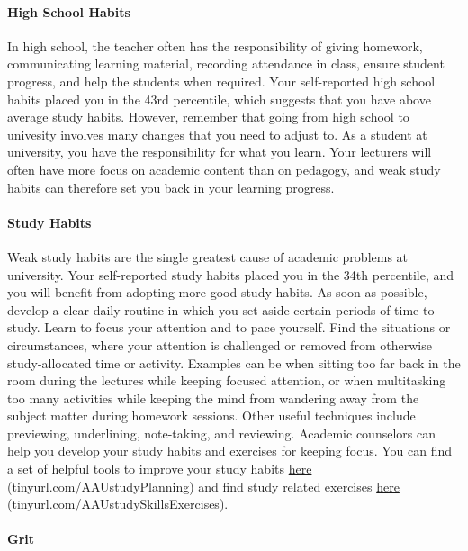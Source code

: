 \documentclass[]{article}
\let\oldparagraph\paragraph
\renewcommand{\paragraph}[1]{\oldparagraph{#1}\mbox{}}
\begin{document}
\paragraph{High School Habits}\label{high-school-habits}

In high school, the teacher often has the responsibility of giving
homework, communicating learning material, recording attendance in
class, ensure student progress, and help the students when required.
Your self-reported high school habits placed you in the 43rd percentile,
which suggests that you have above average study habits. However,
remember that going from high school to univesity involves many changes
that you need to adjust to. As a student at university, you have the
responsibility for what you learn. Your lecturers will often have more
focus on academic content than on pedagogy, and weak study habits can
therefore set you back in your learning progress.

\paragraph{Study Habits}\label{study-habits}

Weak study habits are the single greatest cause of academic problems at
university. Your self-reported study habits placed you in the 34th
percentile, and you will benefit from adopting more good study habits.
As soon as possible, develop a clear daily routine in which you set
aside certain periods of time to study. Learn to focus your attention
and to pace yourself. Find the situations or circumstances, where your
attention is challenged or removed from otherwise study-allocated time
or activity. Examples can be when sitting too far back in the room
during the lectures while keeping focused attention, or when
multitasking too many activities while keeping the mind from wandering
away from the subject matter during homework sessions. Other useful
techniques include previewing, underlining, note-taking, and reviewing.
Academic counselors can help you develop your study habits and exercises
for keeping focus. You can find a set of helpful tools to improve your
study habits \href{tinyurl.com/AAUstudyPlanning}{here}
(tinyurl.com/AAUstudyPlanning) and find study related exercises
\href{tinyurl.com/AAUstudySkillsExercises}{here}
(tinyurl.com/AAUstudySkillsExercises).

\paragraph{Grit}\label{grit}
\end{document}
